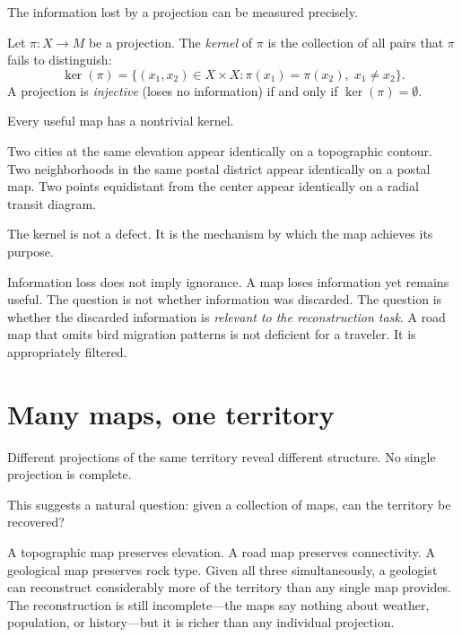 The information lost by a projection can be measured precisely.

\begin{definition}
  \label{def:kernel}
  Let $\pi : X \to M$ be a projection.
  The \emph{kernel} of $\pi$ is the collection of all pairs that
  $\pi$ fails to distinguish:
  \[
    \ker(\pi)
    = \{(x_1, x_2) \in X \times X : \pi(x_1) = \pi(x_2),\;
      x_1 \neq x_2\}.
  \]
  A projection is \emph{injective} (loses no information) if and
  only if $\ker(\pi) = \emptyset$.
\end{definition}

Every useful map has a nontrivial kernel.

Two cities at the same elevation appear identically on a topographic
contour.
Two neighborhoods in the same postal district appear identically on
a postal map.
Two points equidistant from the center appear identically on a
radial transit diagram.

The kernel is not a defect.
It is the mechanism by which the map achieves its purpose.

\begin{Misconception}
  Information loss does not imply ignorance.
  A map loses information yet remains useful.
  The question is not whether information was discarded.
  The question is whether the discarded information is
  \emph{relevant to the reconstruction task}.
  A road map that omits bird migration patterns is not
  deficient for a traveler.
  It is appropriately filtered.
\end{Misconception}


\section{Many maps, one territory}

Different projections of the same territory reveal different
structure.
No single projection is complete.

This suggests a natural question: given a collection of maps,
can the territory be recovered?

\begin{example}
  A topographic map preserves elevation.
  A road map preserves connectivity.
  A geological map preserves rock type.
  Given all three simultaneously, a geologist can reconstruct
  considerably more of the territory than any single map provides.
  The reconstruction is still incomplete---the maps say nothing
  about weather, population, or history---but it is richer than
  any individual projection.
\end{example}

